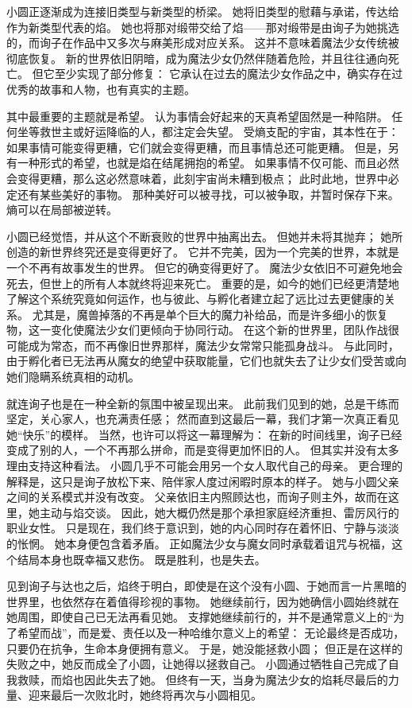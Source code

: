 小圆正逐渐成为连接旧类型与新类型的桥梁。
她将旧类型的慰藉与承诺，传达给作为新类型代表的焰。
她也将那对缎带交给了焰——那对缎带是由询子为她挑选的，而询子在作品中又多次与麻美形成对应关系。
这并不意味着魔法少女传统被彻底恢复。
新的世界依旧阴暗，成为魔法少女仍然伴随着危险，并且往往通向死亡。
但它至少实现了部分修复：
它承认在过去的魔法少女作品之中，确实存在过优秀的故事和人物，也有真实的主题。

其中最重要的主题就是希望。
认为事情会好起来的天真希望固然是一种陷阱。
任何坐等救世主或好运降临的人，都注定会失望。
受熵支配的宇宙，其本性在于：
如果事情可能变得更糟，它们就会变得更糟，而且事情总还可能更糟。
但是，另有一种形式的希望，也就是焰在结尾拥抱的希望。
如果事情不仅可能、而且必然会变得更糟，那么这必然意味着，此刻宇宙尚未糟到极点；
此时此地，世界中必定还有某些美好的事物。
那种美好可以被寻找，可以被争取，并暂时保存下来。
熵可以在局部被逆转。

小圆已经觉悟，并从这个不断衰败的世界中抽离出去。
但她并未将其抛弃；
她所创造的新世界终究还是变得更好了。
它并不完美，因为一个完美的世界，本就是一个不再有故事发生的世界。
但它的确变得更好了。
魔法少女依旧不可避免地会死去，但世上的所有人本就终将迎来死亡。
重要的是，如今的她们已经更清楚地了解这个系统究竟如何运作，也与彼此、与孵化者建立起了远比过去更健康的关系。
尤其是，魔兽掉落的不再是单个巨大的魔力补给品，而是许多细小的恢复物，这一变化使魔法少女们更倾向于协同行动。
在这个新的世界里，团队作战很可能成为常态，而不再像旧世界那样，魔法少女常常只能孤身战斗。
与此同时，由于孵化者已无法再从魔女的绝望中获取能量，它们也就失去了让少女们受苦或向她们隐瞒系统真相的动机。

就连询子也是在一种全新的氛围中被呈现出来。
此前我们见到的她，总是干练而坚定，关心家人，也充满责任感；
然而直到这最后一幕，我们才第一次真正看见她“快乐”的模样。
当然，也许可以将这一幕理解为：
在新的时间线里，询子已经变成了别的人，一个不再那么拼命，而是变得更加怀旧的人。
但其实并没有太多理由支持这种看法。
小圆几乎不可能会用另一个女人取代自己的母亲。
更合理的解释是，这只是询子放松下来、陪伴家人度过闲暇时原本的样子。
她与小圆父亲之间的关系模式并没有改变。
父亲依旧主内照顾达也，而询子则主外，故而在这里，她主动与焰交谈。
因此，她大概仍然是那个承担家庭经济重担、雷厉风行的职业女性。
只是现在，我们终于意识到，她的内心同时存在着怀旧、宁静与淡淡的怅惘。
她本身便包含着矛盾。
正如魔法少女与魔女同时承载着诅咒与祝福，这个结局本身也既幸福又悲伤。
既是胜利，也是失去。

见到询子与达也之后，焰终于明白，即使是在这个没有小圆、于她而言一片黑暗的世界里，也依然存在着值得珍视的事物。
她继续前行，因为她确信小圆始终就在她周围，即使自己已无法再看见她。
支撑她继续前行的，并不是通常意义上的“为了希望而战”，而是爱、责任以及一种哈维尔意义上的希望：
无论最终是否成功，只要仍在抗争，生命本身便拥有意义。
于是，她没能拯救小圆；
但正是在这样的失败之中，她反而成全了小圆，让她得以拯救自己。
小圆通过牺牲自己完成了自我救赎，而焰也因此失去了她。
但终有一天，当身为魔法少女的焰耗尽最后的力量、迎来最后一次败北时，她终将再次与小圆相见。

